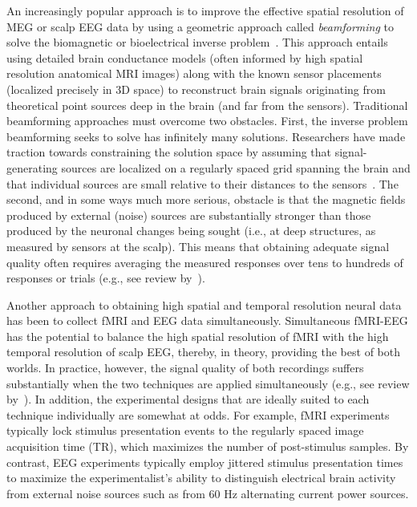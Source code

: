 \documentclass[11pt]{article}
\begin{document}
An increasingly popular approach is to improve the effective spatial
resolution of MEG or scalp EEG data by using a geometric approach
called \textit{beamforming} to solve the biomagnetic or bioelectrical
inverse problem~\cite{Sarv87}.  This approach entails using detailed
brain conductance models (often informed by high spatial resolution
anatomical MRI images) along with the known sensor placements
(localized precisely in 3D space) to reconstruct brain signals
originating from theoretical point sources deep in the brain (and far
from the sensors).  Traditional beamforming approaches must overcome
two obstacles.  First, the inverse problem beamforming seeks to solve
has infinitely many solutions.  Researchers have made traction towards
constraining the solution space by assuming that signal-generating
sources are localized on a regularly spaced grid spanning the brain
and that individual sources are small relative to their distances to
the sensors~\cite{Snyd91, BailEtal01, HillEtal05}.  The second, and in
some ways much more serious, obstacle is that the magnetic fields
produced by external (noise) sources are substantially stronger than
those produced by the neuronal changes being sought (i.e., at deep
structures, as measured by sensors at the scalp).  This means that
obtaining adequate signal quality often requires averaging the
measured responses over tens to hundreds of responses or trials
(e.g., see review by~\cite{HillEtal05}).

Another approach to obtaining high spatial and temporal resolution
neural data has been to collect fMRI and EEG data simultaneously.
Simultaneous fMRI-EEG has the potential to balance the high spatial
resolution of fMRI with the high temporal resolution of scalp EEG,
thereby, in theory, providing the best of both worlds.  In practice,
however, the signal quality of both recordings suffers substantially
when the two techniques are applied simultaneously (e.g., see review
by~\cite{HustEtal12}).  In addition, the experimental designs that are
ideally suited to each technique individually are somewhat at odds.
For example, fMRI experiments typically lock stimulus presentation
events to the regularly spaced image acquisition time (TR), which
maximizes the number of post-stimulus samples.  By contrast, EEG
experiments typically employ jittered stimulus presentation times to
maximize the experimentalist's ability to distinguish electrical brain
activity from external noise sources such as from 60 Hz alternating
current power sources.
\end{document}
